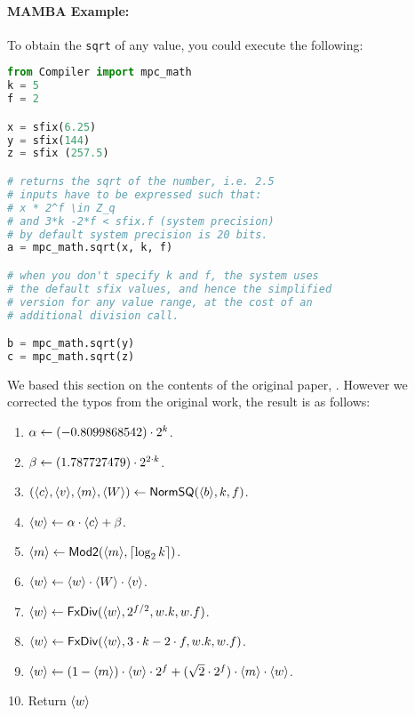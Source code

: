 \paragraph{MAMBA Example:} To obtain the \verb|sqrt| of any value, you could execute the following:
\begin{lstlisting}[language={python}]
from Compiler import mpc_math
k = 5
f = 2

x = sfix(6.25)
y = sfix(144)
z = sfix (257.5)

# returns the sqrt of the number, i.e. 2.5
# inputs have to be expressed such that:
# x * 2^f \in Z_q
# and 3*k -2*f < sfix.f (system precision)
# by default system precision is 20 bits.
a = mpc_math.sqrt(x, k, f)

# when you don't specify k and f, the system uses
# the default sfix values, and hence the simplified
# version for any value range, at the cost of an
# additional division call.

b = mpc_math.sqrt(y)
c = mpc_math.sqrt(z)

\end{lstlisting}

We based this section on the contents of the original paper, \cite{Liedel12}.
However we corrected the typos from the original work, the result is as follows:
\begin{enumerate}
  \item $\alpha \leftarrow (-0.8099868542) \cdot 2^k$.
  \item $\beta \leftarrow (1.787727479) \cdot 2^{2\cdot k}$.
  \item $(\langle c \rangle,\langle v \rangle,\langle m \rangle,\langle W \rangle) \leftarrow \mathsf{NormSQ}(\langle b \rangle,k,f)$.
  \item $\langle w \rangle \leftarrow \alpha \cdot \langle c \rangle+\beta$.
  \item $\langle m \rangle \leftarrow \mathsf{Mod2}(\langle m \rangle,{\lceil \log_2 k \rceil})$.
  \item $\langle w \rangle \leftarrow \langle w \rangle \cdot \langle W \rangle \cdot \langle v \rangle$.
  \item $\langle w \rangle \leftarrow \mathsf{FxDiv}(\langle w \rangle,2^{f/2},w.k,w.f)$.
  \item $\langle w \rangle \leftarrow \mathsf{FxDiv}(\langle w \rangle,3 \cdot k - 2 \cdot f,w.k,w.f)$.
  \item $\langle w \rangle \leftarrow (1-\langle m \rangle) \cdot \langle w \rangle \cdot 2^f
          +(\sqrt{2} \cdot 2^f) \cdot \langle m \rangle\cdot \langle w \rangle$.
  \item Return $\langle w \rangle$ %
\end{enumerate}


